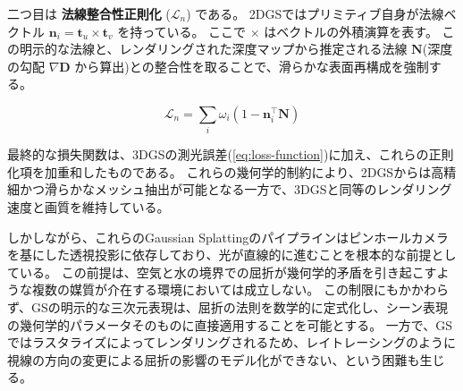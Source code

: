 二つ目は \textbf{法線整合性正則化} ($\mathcal{L}_n$) である。
2DGSではプリミティブ自身が法線ベクトル $\bm{n}_i = \bm{t}_u \times \bm{t}_v$ を持っている。
ここで $\times$ はベクトルの外積演算を表す。
この明示的な法線と、レンダリングされた深度マップから推定される法線 $\bm{N}$(深度の勾配 $\nabla \bm{D}$ から算出)との整合性を取ることで、滑らかな表面再構成を強制する。

\begin{equation}
  \mathcal{L}_n = \sum_{i} \omega_i (1 - \bm{n}_i^\top \bm{N})
\end{equation}

最終的な損失関数は、3DGSの測光誤差(\cref{eq:loss-function})に加え、これらの正則化項を加重和したものである。
これらの幾何学的制約により、2DGSからは高精細かつ滑らかなメッシュ抽出が可能となる一方で、3DGSと同等のレンダリング速度と画質を維持している。

\vspace{3em}
しかしながら、これらのGaussian Splattingのパイプラインはピンホールカメラを基にした透視投影に依存しており、光が直線的に進むことを根本的な前提としている。
この前提は、空気と水の境界での屈折が幾何学的矛盾を引き起こすような複数の媒質が介在する環境においては成立しない。
この制限にもかかわらず、GSの明示的な三次元表現は、屈折の法則を数学的に定式化し、シーン表現の幾何学的パラメータそのものに直接適用することを可能とする。
一方で、GSではラスタライズによってレンダリングされるため、レイトレーシングのように視線の方向の変更による屈折の影響のモデル化\cite{Zhan2023CVPR_NeRFrac}ができない、という困難も生じる。